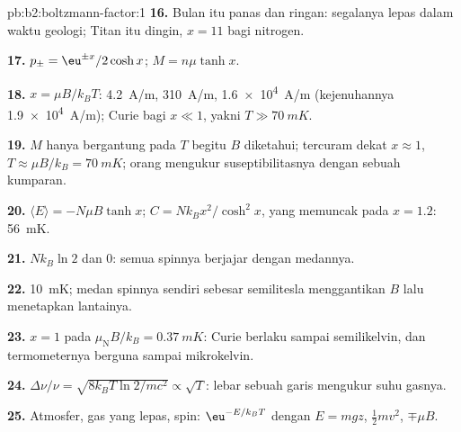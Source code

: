 \begin{solution}{pb:b2:boltzmann-factor:1}
\textbf{16.} Bulan itu panas dan ringan: segalanya lepas dalam
waktu geologi; Titan itu dingin, $x = 11$ bagi nitrogen.

\textbf{17.} $p_\pm = \eu^{\pm x}/2\cosh x$; $M = n\mu\tanh x$.

\textbf{18.} $x = \mu B/k_BT$: \qty{4.2}{A/m}, \qty{310}{A/m}, \qty{1.6e4}{A/m}
(kejenuhannya \qty{1.9e4}{A/m}); Curie bagi $x \ll 1$, yakni $T \gg \qty{70}{mK}$.

\textbf{19.} $M$ hanya bergantung pada $T$ begitu $B$ diketahui; tercuram dekat
$x \approx 1$, $T \approx \mu B/k_B = \qty{70}{mK}$; orang mengukur
suseptibilitasnya dengan sebuah kumparan.

\textbf{20.} $\langle E\rangle = -N\mu B\tanh x$; $C = Nk_Bx^2/\cosh^2x$, yang memuncak pada
$x = 1.2$: \qty{56}{mK}.

\textbf{21.} $Nk_B\ln 2$ dan $0$: semua spinnya berjajar dengan medannya.

\textbf{22.} \qty{10}{mK}; medan spinnya sendiri sebesar semilitesla menggantikan $B$
lalu menetapkan lantainya.

\textbf{23.} $x = 1$ pada $\mu_{\text{N}}B/k_B = \qty{0.37}{mK}$: Curie berlaku sampai
semilikelvin, dan termometernya berguna sampai mikrokelvin.

\textbf{24.} $\Delta\nu/\nu = \sqrt{8k_BT\ln2/mc^2} \propto \sqrt T$: lebar
sebuah garis mengukur suhu gasnya.

\textbf{25.} Atmosfer, gas yang lepas, spin: $\eu^{-E/k_BT}$ dengan $E = mgz$,
$\tfrac12mv^2$, $\mp\mu B$.
\end{solution}
